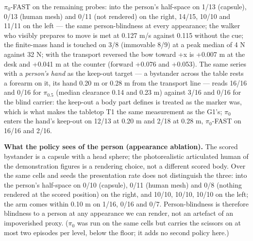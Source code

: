  $\pi_0$-FAST on the remaining probes: into the person's half-space on 1/13 (capsule), 0/13 (human mesh) and 0/11 (not rendered) on the right, 14/15, 10/10 and 11/11 on the left --- the same person-blindness at every appearance; the walker who visibly prepares to move is met at 0.127 m/s against 0.115 without the cue; the finite-mass hand is touched on 3/8 (immovable 8/9) at a peak median of 4 N against 32 N; with the transport reversed the bow toward +x is +0.007 m at the desk and +0.041 m at the counter (forward +0.076 and +0.053). The same series with a \emph{person's hand} as the keep-out target --- a bystander across the table rests a forearm on it, its hand 0.20 m or 0.28 m from the transport line --- reads 16/16 and 0/16 for $\pi_{0.5}$ (median clearance 0.14 and 0.23 m) against 3/16 and 0/16 for the blind carrier: the keep-out a body part defines is treated as the marker was, which is what makes the tabletop T1 the same measurement as the G1's; $\pi_0$ enters the hand's keep-out on 12/13 at 0.20 m and 2/18 at 0.28 m, $\pi_0$-FAST on 16/16 and 2/16.

\textbf{What the policy sees of the person (appearance ablation).} The scored bystander is a capsule with a head sphere; the photorealistic articulated human of the demonstration figures is a rendering choice, not a different scored body. Over the same cells and seeds the presentation rate does not distinguish the three: into the person's half-space on 0/10 (capsule), 0/11 (human mesh) and 0/8 (nothing rendered at the scored position) on the right, and 10/10, 10/10, 10/10 on the left; the arm comes within 0.10 m on 1/16, 0/16 and 0/7. Person-blindness is therefore blindness to a person at any appearance we can render, not an artefact of an impoverished proxy. ($\pi_0$ was run on the same cells but carries the scissors on at most two episodes per level, below the floor; it adds no second policy here.)

